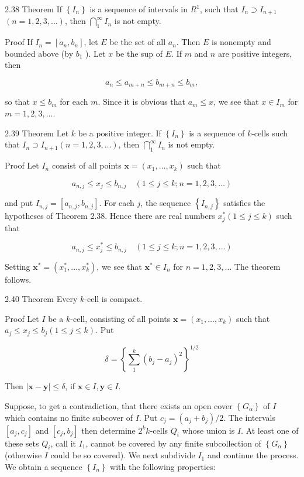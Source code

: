 \documentclass[10pt]{article}
\begin{document}
2.38 Theorem If $\left\{I_{n}\right\}$ is a sequence of intervals in $R^{1}$, such that $I_{n} \supset I_{n+1}$ $(n=1,2,3, \ldots)$, then $\bigcap_{1}^{\infty} I_{n}$ is not empty.

Proof If $I_{n}=\left[a_{n}, b_{n}\right]$, let $E$ be the set of all $a_{n}$. Then $E$ is nonempty and bounded above (by $b_{1}$ ). Let $x$ be the sup of $E$. If $m$ and $n$ are positive integers, then

$$
a_{n} \leq a_{m+n} \leq b_{m+n} \leq b_{m},
$$

so that $x \leq b_{m}$ for each $m$. Since it is obvious that $a_{m} \leq x$, we see that $x \in I_{m}$ for $m=1,2,3, \ldots$.

2.39 Theorem Let $k$ be a positive integer. If $\left\{I_{n}\right\}$ is a sequence of $k$-cells such that $I_{n} \supset I_{n+1}(n=1,2,3, \ldots)$, then $\bigcap_{1}^{\infty} I_{n}$ is not empty.

Proof Let $I_{n}$ consist of all points $\mathbf{x}=\left(x_{1}, \ldots, x_{k}\right)$ such that

$$
a_{n, j} \leq x_{j} \leq b_{n, j} \quad(1 \leq j \leq k ; n=1,2,3, \ldots)
$$

and put $I_{n, j}=\left[a_{n, j}, b_{n, j}\right]$. For each $j$, the sequence $\left\{I_{n, j}\right\}$ satisfies the hypotheses of Theorem 2.38. Hence there are real numbers $x_{j}^{*}(1 \leq j \leq k)$ such that

$$
a_{n, j} \leq x_{j}^{*} \leq b_{n, j} \quad(1 \leq j \leq k ; n=1,2,3, \ldots)
$$

Setting $\mathbf{x}^{*}=\left(x_{1}^{*}, \ldots, x_{k}^{*}\right)$, we see that $\mathbf{x}^{*} \in I_{n}$ for $n=1,2,3, \ldots$ The theorem follows.

2.40 Theorem Every $k$-cell is compact.

Proof Let $I$ be a $k$-cell, consisting of all points $\mathbf{x}=\left(x_{1}, \ldots, x_{k}\right)$ such that $a_{j} \leq x_{j} \leq b_{j}(1 \leq j \leq k)$. Put

$$
\delta=\left\{\sum_{1}^{k}\left(b_{j}-a_{j}\right)^{2}\right\}^{1 / 2}
$$

Then $|\mathbf{x}-\mathbf{y}| \leq \delta$, if $\mathbf{x} \in I, \mathbf{y} \in I$.

Suppose, to get a contradiction, that there exists an open cover $\left\{G_{\alpha}\right\}$ of $I$ which contains no finite subcover of $I$. Put $c_{j}=\left(a_{j}+b_{j}\right) / 2$. The intervals $\left[a_{j}, c_{j}\right]$ and $\left[c_{j}, b_{j}\right]$ then determine $2^{k} k$-cells $Q_{i}$ whose union is $I$. At least one of these sets $Q_{i}$, call it $I_{1}$, cannot be covered by any finite subcollection of $\left\{G_{\alpha}\right\}$ (otherwise $I$ could be so covered). We next subdivide $I_{1}$ and continue the process. We obtain a sequence $\left\{I_{n}\right\}$ with the following properties:
\end{document}
